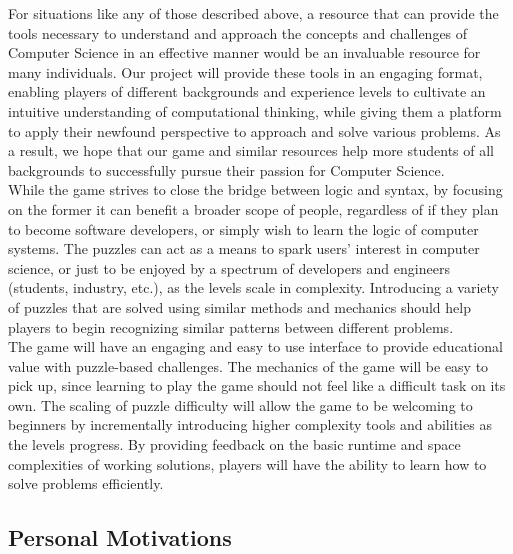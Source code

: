 For situations like any of those described above, a resource that can provide
the tools necessary to understand and approach the concepts and challenges of
Computer Science in an effective manner would be an invaluable resource for many
individuals. Our project will provide these tools in an engaging format,
enabling players of different backgrounds and experience levels to cultivate an
intuitive understanding of computational thinking, while giving them a platform
to apply their newfound perspective to approach and solve various problems. As a
result, we hope that our game and similar resources help more students of all
backgrounds to successfully pursue their passion for Computer Science.\\

While the game strives to close the bridge between logic and syntax, by focusing
on the former it can benefit a broader scope of people, regardless of if they
plan to become software developers, or simply wish to learn the logic of
computer systems. The puzzles can act as a means to spark users’ interest in
computer science, or just to be enjoyed by a spectrum of developers and
engineers (students, industry, etc.), as the levels scale in complexity. Introducing
a variety of puzzles that are solved using similar methods and mechanics should
help players to begin recognizing similar patterns between different problems.\\

The game will have an engaging and easy to use interface to provide educational
value with puzzle-based challenges. The mechanics of the game will be easy to
pick up, since learning to play the game should not feel like a difficult task
on its own. The scaling of puzzle difficulty will allow the game to be welcoming
to beginners by incrementally introducing higher complexity tools and abilities
as the levels progress. By providing feedback on the basic runtime and space
complexities of working solutions, players will have the ability to learn how to
solve problems efficiently.\\

\subsection{Personal Motivations}
